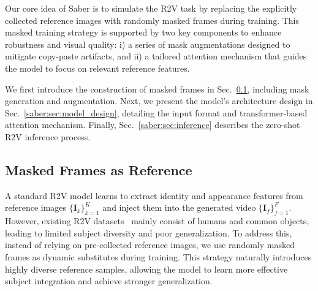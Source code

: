 Our core idea of Saber is to simulate the R2V task by replacing the explicitly collected reference images with randomly masked frames during training.
This masked training strategy is supported by two key components to enhance robustness and visual quality: i) a series of mask augmentations designed to mitigate copy-paste artifacts, and ii) a tailored attention mechanism that guides the model to focus on relevant reference features.

We first introduce the construction of masked frames in Sec.~\ref{saber:sec:masked_frames}, including mask generation and augmentation.
Next, we present the model's architecture design in Sec.~\ref{saber:sec:model_design}, detailing the input format and transformer-based attention mechanism.
Finally, Sec.~\ref{saber:sec:inference} describes the zero-shot R2V inference process.


\subsection{Masked Frames as Reference}
\label{saber:sec:masked_frames}

A standard R2V model learns to extract identity and appearance features from reference images $\{ \mathbf{I}_k \}_{k=1}^{K}$ and inject them into the generated video $\{ \mathbf{I}_{f} \}_{f=1}^{F}$.
However, existing R2V datasets~\citep{yuan2025opens2v, chen2025phantom} mainly consist of humans and common objects, leading to limited subject diversity and poor generalization.
To address this, instead of relying on pre-collected reference images, we use randomly masked frames as dynamic substitutes during training. 
This strategy naturally introduces highly diverse reference samples, allowing the model to learn more effective subject integration and achieve stronger generalization.


